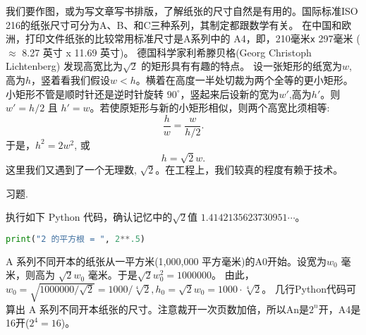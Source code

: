 \documentclass[main.tex]{subfiles}
\begin{document}
我们要作图，或为写文章写书排版，了解纸张的尺寸自然是有用的。国际标准ISO 216的纸张尺寸可分为A、B、和C三种系列，其制定都跟数学有关。
在中国和欧洲，打印文件纸张的比较常用标准尺寸是A系列中的 A4，即，210毫米\texttt{x}{ }297毫米 ($\approx$ 8.27 英寸 x 11.69 英寸)。
 德国科学家利希滕贝格(Georg Christoph Lichtenberg) 发现高宽比为$\sqrt{2}$
的矩形具有有趣的特点。
设一张矩形的纸宽为$w$,高为$h$，竖着看我们假设$w <h$。横着在高度一半处切裁为两个全等的更小矩形。小矩形不管是顺时针还是逆时针旋转 $90^\circ$，竖起来后设新的宽为$w'$,高为$h'$。则
$w' = h/2$ 且 $h' = w$。若使原矩形与新的小矩形相似，则两个高宽比须相等:
$$\frac{h}{w} = \frac{w}{h/2}.   $$
于是，$h^2= 2 w^2$, 或
 $$h= \sqrt{2} w.$$
这里我们又遇到了一个无理数, $\sqrt{2}$。在工程上，我们较真的程度有赖于技术。
	
\begin{kaishu}习题.\end{kaishu} 执行如下 Python 代码，确认记忆中的$\sqrt{2}$值 $1.4142135623730951\cdots$。
\begin{spacing}{0.8}
	\begin{small}
	\begin{lstlisting}[language=Python]
print("2 的平方根 = ", 2**.5)
\end{lstlisting}
\end{small}
\end{spacing}

A 系列不同开本的纸张从一平方米(1,000,000 平方毫米)的A0开始。设宽为$w_0$ 毫米，则高为
$\sqrt{2}w_0$ 毫米。于是$\sqrt{2}w_0^2 = 1000000$。
由此，
$w_0 = \sqrt{1000000/\sqrt{2}}=1000/\sqrt[4]{2}, 
h_0=\sqrt{2}w_0=1000\cdot\sqrt[4]{2}$。
几行Python代码可算出 A 系列不同开本纸张的尺寸。注意裁开一次页数加倍，所以An是$2^n$开，A4是16开($2^4=16$)。
\end{document}
